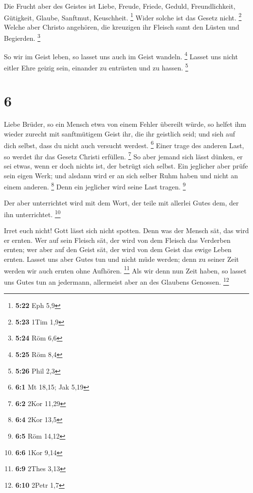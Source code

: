  Die Frucht aber des Geistes ist Liebe, Freude, Friede,
Geduld, Freundlichkeit, Gütigkeit, Glaube, Sanftmut, Keuschheit.
\footnote{\textbf{5:22} Eph 5,9}  Wider solche ist das
Gesetz nicht. \footnote{\textbf{5:23} 1Tim 1,9}  Welche
aber Christo angehören, die kreuzigen ihr Fleisch samt den Lüsten und
Begierden. \footnote{\textbf{5:24} Röm 6,6}

 So wir im Geist leben, so lasset uns auch im Geist
wandeln. \footnote{\textbf{5:25} Röm 8,4}  Lasset uns
nicht eitler Ehre geizig sein, einander zu entrüsten und zu hassen.
\footnote{\textbf{5:26} Phil 2,3}

\hypertarget{section-1}{%
\section{6}\label{section-1}}

 Liebe Brüder, so ein Mensch etwa von einem Fehler
übereilt würde, so helfet ihm wieder zurecht mit sanftmütigem Geist ihr,
die ihr geistlich seid; und sieh auf dich selbst, dass du nicht auch
versucht werdest. \footnote{\textbf{6:1} Mt 18,15; Jak 5,19}
 Einer trage des anderen Last, so werdet ihr das Gesetz
Christi erfüllen. \footnote{\textbf{6:2} 2Kor 11,29}  So
aber jemand sich lässt dünken, er sei etwas, wenn er doch nichts ist,
der betrügt sich selbst.  Ein jeglicher aber prüfe sein
eigen Werk; und alsdann wird er an sich selber Ruhm haben und nicht an
einem anderen. \footnote{\textbf{6:4} 2Kor 13,5}  Denn ein
jeglicher wird seine Last tragen. \footnote{\textbf{6:5} Röm 14,12}

 Der aber unterrichtet wird mit dem Wort, der teile mit
allerlei Gutes dem, der ihn unterrichtet. \footnote{\textbf{6:6} 1Kor
  9,14}

 Irret euch nicht! Gott lässt sich nicht spotten. Denn was
der Mensch sät, das wird er ernten.  Wer auf sein Fleisch
sät, der wird von dem Fleisch das Verderben ernten; wer aber auf den
Geist sät, der wird von dem Geist das ewige Leben ernten. 
Lasset uns aber Gutes tun und nicht müde werden; denn zu seiner Zeit
werden wir auch ernten ohne Aufhören. \footnote{\textbf{6:9} 2Thes 3,13}
 Als wir denn nun Zeit haben, so lasset uns Gutes tun an
jedermann, allermeist aber an des Glaubens Genossen. \footnote{\textbf{6:10}
  2Petr 1,7}

